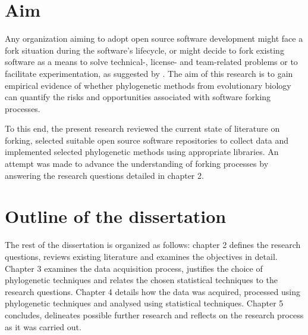 
\section{Aim}
\label{aim}

Any organization aiming to adopt open source software development might face a fork situation during the software's lifecycle, or might decide to fork existing software as a means to solve technical-, license- and team-related problems or to facilitate experimentation, as suggested by \citet{Robles2012a}. The aim of this research is to gain empirical evidence of whether phylogenetic methods from evolutionary biology can quantify the risks and opportunities associated with software forking processes.

To this end, the present research reviewed the current state of literature on forking, selected suitable open source software repositories to collect data and implemented selected phylogenetic methods using appropriate libraries. An attempt was made to advance the understanding of forking processes by answering the research questions detailed in chapter 2.


\section{Outline of the dissertation}
The rest of the dissertation is organized as follows: chapter 2 defines the research questions, reviews existing literature and examines the objectives in detail. Chapter 3 examines the data acquisition process, justifies the choice of phylogenetic techniques and relates the chosen statistical techniques to the research questions. Chapter 4 details how the data was acquired, processed using phylogenetic techniques and analysed using statistical techniques. Chapter 5 concludes, delineates possible further research and reflects on the research process as it was carried out.
